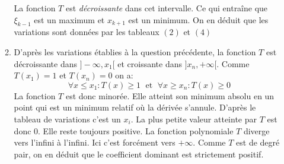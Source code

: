 \begin{enumerate}
\begin{enumerate}
\begin{displaymath}
\end{displaymath}
La fonction $T$ est \emph{décroissante} dans cet intervalle. Ce qui entraîne que $\xi_{k-1}$ est un maximum et $x_{k+1}$ est un minimum. On en déduit que les variations sont données par les tableaux $(2)$ et $(4)$
\item D'après les variations établies à la question précédente, la fonction $T$ est décroissante dans $]-\infty,x_1[$ et croissante dans $]x_n,+\infty[$. Comme $T(x_1)=1$ et $T(x_{n})=0$ on a:
\begin{displaymath}
 \forall x \leq x_1 : T(x)\geq 1 \; \text{ et } \;
\forall x\geq x_n : T(x)\geq 0
\end{displaymath}
La fonction $T$ est donc minorée. Elle atteint son minimum absolu en un point qui est un minimum relatif où la dérivée s'annule. D'après le tableau de variations c'est un $x_i$. La plus petite valeur atteinte par $T$ est donc $0$. Elle reste toujours positive.\newline
La fonction polynomiale $T$ diverge vers l'infini à l'infini. Ici c'est forcément vers $+\infty$. Comme $T$ est de degré pair, on en déduit que le coefficient dominant est strictement positif. 
\end{enumerate}
\end{enumerate} 